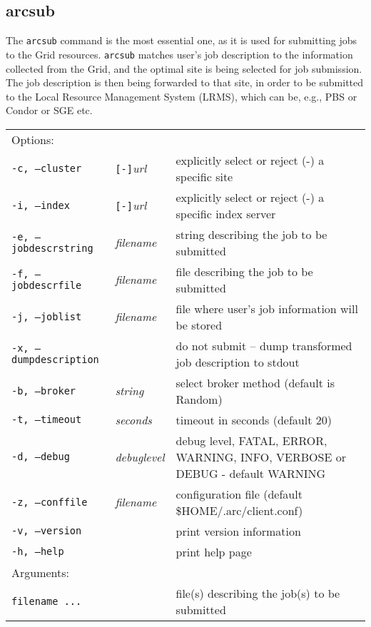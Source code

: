 \subsection{arcsub}\label{sec:arcsub}
The \texttt{arcsub} command is the
most essential one, as it is used for submitting jobs to the Grid
resources. \texttt{arcsub} matches user's job
description to the information collected from the Grid, and the
optimal site is being selected for job submission. The job description
is then being forwarded to that site, in order to be submitted to the
Local Resource Management System (LRMS), which can be, e.g., PBS or
Condor or SGE etc.

\hspace*{0.5cm}
\begin{shaded}
\end{shaded}
\begin{longtable}{llp{8cm}}
   Options:&&\\
   \texttt{-c, --cluster}&\verb#[-]#\textit{url}&explicitly select or reject (-) a specific site\\
   \texttt{-i, --index}&\verb#[-]#\textit{url}&explicitly select or reject (-) a specific index server\\
   \texttt{-e, --jobdescrstring}&\textit{filename}&string describing the job to be submitted\\
   \texttt{-f, --jobdescrfile}&\textit{filename}&file describing the job to be submitted\\
   \texttt{-j, --joblist}&\textit{filename}&file where user's job information will be stored\\
   \texttt{-x, --dumpdescription}&&do not submit -- dump transformed job description to stdout\\
   \texttt{-b, --broker}&\textit{string}&select broker method (default is Random)\\
   \texttt{-t, --timeout}&\textit{seconds}&timeout in seconds (default 20)\\
   \texttt{-d, --debug}&\textit{debuglevel}&debug level, FATAL, ERROR, WARNING, INFO, VERBOSE or DEBUG - default WARNING\\
   \texttt{-z, --conffile}&\textit{filename}& configuration file (default {\$}HOME/.arc/client.conf)\\
   \texttt{-v, --version}&&print version information\\
   \texttt{-h, --help}&&print help page\\
   Arguments:&&\\
   \texttt{filename ...}&&file(s) describing the job(s) to be submitted\\
\end{longtable}

